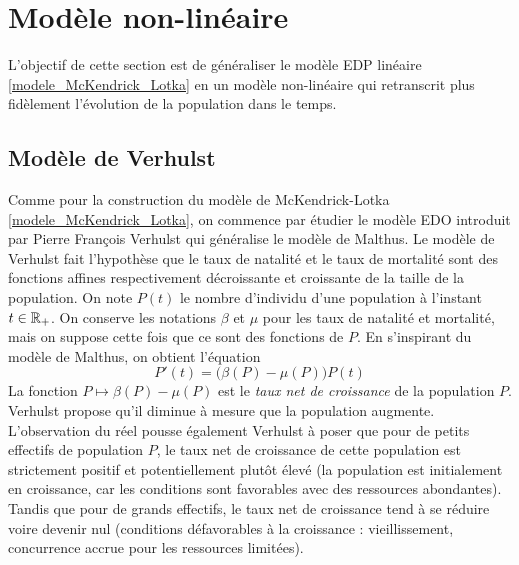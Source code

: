 \section{Modèle non-linéaire}
L'objectif de cette section est de généraliser le modèle EDP linéaire \eqref{modele_McKendrick_Lotka} en un modèle non-linéaire qui retranscrit plus fidèlement l'évolution de la population dans le temps.

\subsection{Modèle de Verhulst}
Comme pour la construction du modèle de McKendrick-Lotka \eqref{modele_McKendrick_Lotka}, on commence par étudier le modèle EDO introduit par Pierre François Verhulst qui généralise le modèle de Malthus. Le modèle de Verhulst fait l'hypothèse que le taux de natalité et le taux de mortalité sont des fonctions affines respectivement décroissante et croissante de la taille de la population. On note $P(t)$ le nombre d'individu d'une population à l'instant $t \in \mathbb{R}_+$. On conserve les notations $\beta$ et $\mu$ pour les taux de natalité et mortalité, mais on suppose cette fois que ce sont des fonctions de $P$. En s'inspirant du modèle de Malthus, on obtient l'équation 
\begin{equation*}
    P'(t) = \big(\beta(P)-\mu(P)\big)P(t)
\end{equation*}
La fonction $P \mapsto \beta(P)-\mu(P)$ est le \textcolor{astral}{\textit{taux net de croissance}} de la population $P$. Verhulst propose qu’il diminue à mesure que la population augmente. L’observation du réel pousse également Verhulst à poser que pour de petits effectifs de population $P$, le taux net de croissance de cette population est strictement positif et potentiellement plutôt élevé (la population est initialement en croissance, car les conditions sont favorables avec des ressources abondantes). Tandis que pour de grands effectifs, le taux net de croissance tend à se réduire voire devenir nul (conditions défavorables à la croissance : vieillissement, concurrence accrue pour les ressources limitées).

